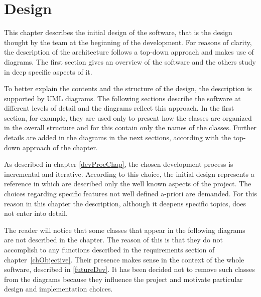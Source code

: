 \chapter{Design}
	This chapter describes the initial design of the software, that is the design thought by the team at the beginning of the development.
	For reasons of clarity, the description of the architecture follows a top-down approach and makes use of diagrams. 		The first section gives an overview of the software and the others study in deep specific aspects of it.

	To better explain the contents and the structure of the design, the description is supported by \mbox{UML} diagrams. The following sections describe the software at different levels of detail and the diagrams reflect this approach. In the first section, for example, they are used only to present how the classes are organized in the overall structure and for this contain only the names of the classes. Further details are added in the diagrams in the next sections, according with the top-down approach of the chapter.

	As described in chapter \ref{devProcChap}, the chosen development process is incremental and iterative.
	According to this choice, the initial design represents a reference in which are described only the well known aspects of the project. The choices regarding specific features not well defined a-priori are demanded. For this reason in this chapter the description, although it deepens specific topics, does not enter into detail. 
		
	The reader will notice that some classes that appear in the following diagrams are not described in the chapter. The reason of this is that they do not accomplish to any functions described in the requirements section of \mbox{chapter \ref{chObjective}}. Their presence makes sense in the context of the whole software, described in \ref{futureDev}. It has been decided not to remove such classes from the diagrams because they influence the project and motivate particular design and implementation choices.

